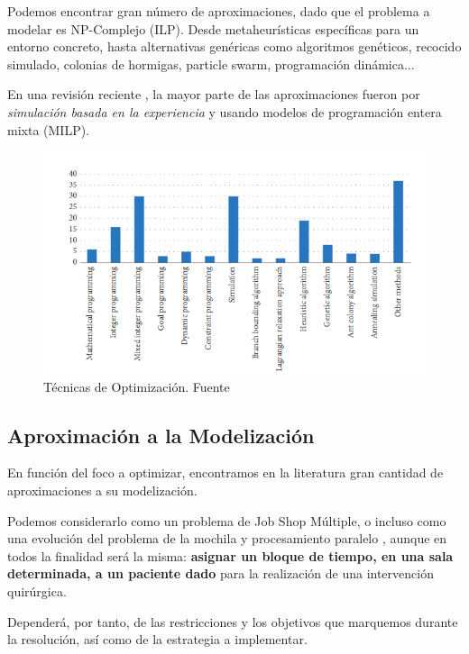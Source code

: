 Podemos encontrar gran número de aproximaciones, dado que el problema a modelar es NP-Complejo (ILP). Desde metaheurísticas específicas para un entorno concreto, hasta alternativas genéricas como algoritmos genéticos, recocido simulado, colonias de hormigas, particle swarm, programación dinámica... 

En una revisión reciente \cite{Gur2018ApplicationOverview}, la mayor parte de las aproximaciones fueron por \textit{simulación basada en la experiencia} y usando modelos de programación entera mixta (MILP).


\begin{figure}
    \centering
    \includegraphics{Memoria TFG/img/graficoAlgoritmos.png}
    \caption{Técnicas de Optimización. Fuente \cite{Gur2018ApplicationOverview}}
    \label{GraficoTecnicasOpt}
\end{figure}

\subsection{Aproximación a la Modelización}

En función del foco a optimizar, encontramos en la literatura gran cantidad de aproximaciones a su modelización.

Podemos considerarlo como un problema de Job Shop Múltiple, o incluso como una evolución del problema de la mochila y procesamiento paralelo \cite{Lin2020AScheduling}, aunque en todos la finalidad será la misma: \textbf{asignar un bloque de tiempo, en una sala determinada, a un paciente dado} para la realización de una intervención quirúrgica.

Dependerá, por tanto, de las restricciones y los objetivos que marquemos durante la resolución, así como de la estrategia a implementar.

